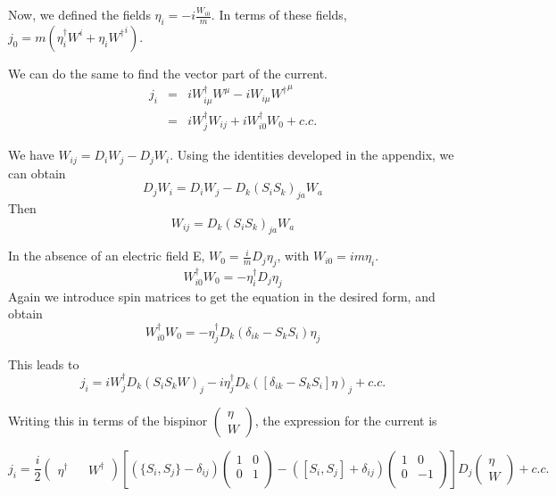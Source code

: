 Now, we defined the fields $\eta_i = -i \frac{W_{i0}}{m}$.  In terms of these fields,
$j_0 =  m (\eta_i^\dagger  W^i + \eta_i {W^\dagger}^i )$. 

We can do the same to find the vector part of the current.
\begin{eqnarray*}
	j_i &=& i W_{i \mu}^\dagger W^{\mu} - i W_{i \mu} {W^{\dagger}}^\mu 	\\
	&=&	i W_j^\dagger W_{ij}  + i W_{i0}^\dagger W_0 + c.c.
\end{eqnarray*}

We have $W_{ij} = D_i W_j - D_j W_i$.  Using the identities developed in the appendix, we can obtain
\[ D_j W_i = D_i W_j - D_k(S_i S_k)_{ja} W_a 	\]
Then
\[ W_{ij} = D_k (S_i S_k)_{ja} W_a 	\]

In the absence of an electric field E, $W_{0} = \frac{i}{m} D_j \eta_j$, with $W_{i0} = i m \eta_i$.
\[	W_{i0}^\dagger W_0 = - \eta_i^\dagger D_j \eta_j 	\]
Again we introduce spin matrices to get the equation in the desired form, and obtain
\[	W_{i0}^\dagger W_0 = - \eta_j^\dagger D_k (\delta_{ik} - S_k S_i) \eta_j 	\]

This leads to
\[ j_i = i W_j^\dagger D_k (S_i S_k W)_j - i \eta_j^\dagger D_k ([\delta_{ik} - S_k S_i]\eta)_j + c.c. \]

Writing this in terms of the bispinor $\begin{pmatrix}\eta \\ W\end{pmatrix}$, the expression for the current is

\begin{equation}	j_i	=
		\frac{i}{2} \begin{pmatrix}\eta^\dagger && W^\dagger \end{pmatrix} \left [
		(\{S_i, S_j\} - \delta_{ij})  
		\begin{pmatrix} 
			1 & 0 \\
			0 & 1 \\ 
		\end{pmatrix}
		- ([S_i, S_j] +\delta_{ij})	\begin{pmatrix} 1 & 0 \\ 0 & -1 \\ \end{pmatrix}
		\right ]
		D_j \begin{pmatrix}\eta \\ W\end{pmatrix} + c.c.
\end{equation}





